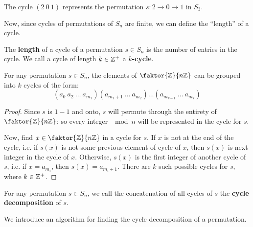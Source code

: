 \begin{example}
  The cycle $(2 \ 0 \ 1)$ represents the permutation $s:2 \rightarrow 0
  \rightarrow 1$ in $S_3$.
\end{example}

Now, since cycles of permutations of $S_n$ are finite, we can define the
``length'' of a cycle.

\begin{definition}
  The \textbf{length} of a cycle of a permutation $s \in S_n$ is the number of
  entries in the cycle. We call a cycle of length  $k \in \mathbb{Z}^+$ a
  \textbf{$k$-cycle}.
\end{definition}

\begin{proposition}\label{proposition_1.3.3}
  For any permutation $s \in S_n$, the elements of  $\faktor{\Z}{n\Z}$ can be
  grouped into $k$ cycles of the form:
  \begin{equation}
    (a_0 \ a_2 \ \dots \ a_{m_1})(a_{m_1+1} \ \dots \ a_{m_2}) \dots
    (a_{m_{k-1}} \ \dots \ a_m_k)
  \end{equation}
\end{proposition}
\begin{proof}
  Since $s$ is  $1-1$ and onto,  $s$ will permute through the entirety of
  $\faktor{\Z}{n\Z}$; so every integer $\mod{n}$ will be represented in the
  cycle for $s$.

  Now, find  $x \in \faktor{\Z}{n\Z}$ in a cycle for $s$. If  $x$ is not at
  the end of the cycle, i.e. if  $s(x)$ is not some previous element of cycle
  of $x$, then $s(x)$ is next integer in the cycle of $x$. Otherwise,  $s(x)$
  is the first integer of another cycle of $s$, i.e. if  $x=a_{m_i}$, then
  $s(x)=a_{m_i+1}$. There are $k$ such possible cycles for  $s$, where  $k \in
  \mathbb{Z}^+$.
\end{proof}

\begin{definition}
  For any permutation $s \in S_n$, we  call the concatenation of all cycles
  of $s$ the  \textbf{cycle decomposition} of $s$.
\end{definition}

We introduce an algorithm for finding the cycle decomposition of a
permutation.

